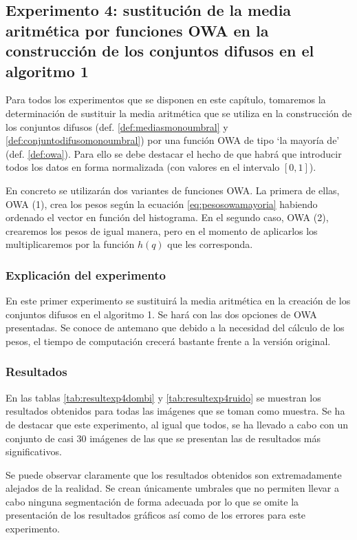 
\subsection{Experimento 4: sustitución de la media aritmética por funciones OWA en la construcción de los conjuntos difusos en el algoritmo 1}
Para todos los experimentos que se disponen en este capítulo, tomaremos la determinación de sustituir la media aritmética que se utiliza en la construcción de los conjuntos difusos (def. \ref{def:mediasmonoumbral} y \ref{def:conjuntodifusomonoumbral}) por una función OWA de tipo `la mayoría de' (def. \ref{def:owa}). Para ello se debe destacar el hecho de que habrá que introducir todos los datos en forma normalizada (con valores en el intervalo $[0,1]$).

En concreto se utilizarán dos variantes de funciones OWA. La primera de ellas, OWA (1), crea los pesos según la ecuación \ref{eq:pesosowamayoria} habiendo ordenado el vector en función del histograma. En el segundo caso, OWA (2), crearemos los pesos de igual manera, pero en el momento de aplicarlos los multiplicaremos por la función $h(q)$ que les corresponda.

\subsubsection{Explicación del experimento}
En este primer experimento se sustituirá la media aritmética en la creación de los conjuntos difusos en el algoritmo 1. Se hará con las dos opciones de OWA presentadas. Se conoce de antemano que debido a la necesidad del cálculo de los pesos, el tiempo de computación crecerá bastante frente a la versión original.


\subsubsection{Resultados}

En las tablas \ref{tab:resultexp4dombi} y \ref{tab:resultexp4ruido} se muestran los resultados obtenidos para todas las imágenes que se toman como muestra. Se ha de destacar que este experimento, al igual que todos, se ha llevado a cabo con un conjunto de casi 30 imágenes de las que se presentan las de resultados más significativos. 

Se puede observar claramente que los resultados obtenidos son extremadamente alejados de la realidad. Se crean únicamente umbrales que no permiten llevar a cabo ninguna segmentación de forma adecuada por lo que se omite la presentación de los resultados gráficos así como de los errores para este experimento.


